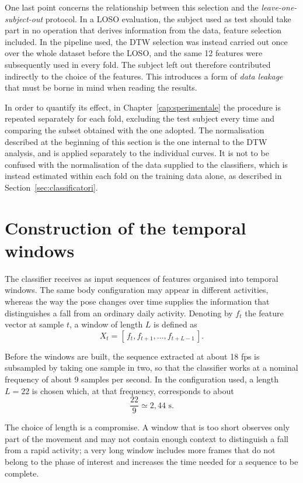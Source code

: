 One last point concerns the relationship between this selection and the \emph{leave-one-subject-out} protocol. In a LOSO evaluation, the subject used as test should take part in no operation that derives information from the data, feature selection included. In the pipeline used, the DTW selection was instead carried out once over the whole dataset before the LOSO, and the same 12 features were subsequently used in every fold. The subject left out therefore contributed indirectly to the choice of the features. This introduces a form of \emph{data leakage} that must be borne in mind when reading the results.

In order to quantify its effect, in Chapter~\ref{cap:sperimentale} the procedure is repeated separately for each fold, excluding the test subject every time and comparing the subset obtained with the one adopted. The normalisation described at the beginning of this section is the one internal to the DTW analysis, and is applied separately to the individual curves. It is not to be confused with the normalisation of the data supplied to the classifiers, which is instead estimated within each fold on the training data alone, as described in Section~\ref{sec:classificatori}.

\section{Construction of the temporal windows}
\label{sec:finestre}

The classifier receives as input sequences of features organised into temporal windows. The same body configuration may appear in different activities, whereas the way the pose changes over time supplies the information that distinguishes a fall from an ordinary daily activity.
Denoting by $f_t$ the feature vector at sample $t$, a window of length \(L\) is defined as
\[
X_t = [\,f_t, f_{t+1},\dots, f_{t+L-1}\,].
\]

Before the windows are built, the sequence extracted at about 18 fps is subsampled by taking one sample in two, so that the classifier works at a nominal frequency of about 9 samples per second. In the configuration used, a length $L=22$ is chosen which, at that frequency, corresponds to about
\[
\frac{22}{9}\simeq 2{,}44\text{ s}.
\]

The choice of length is a compromise. A window that is too short observes only part of the movement and may not contain enough context to distinguish a fall from a rapid activity; a very long window includes more frames that do not belong to the phase of interest and increases the time needed for a sequence to be complete.

